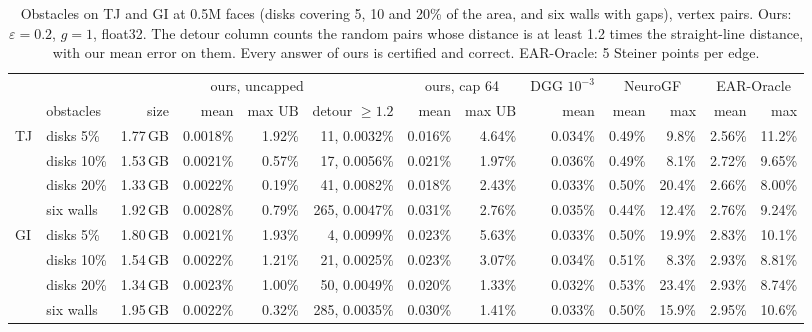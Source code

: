 \documentclass[sigconf,nonacm,screen]{acmart}
\newcommand{\UB}{\mathrm{UB}}
\newcommand{\eps}{\varepsilon}
\begin{document}
\begin{table}[t]
\caption{Obstacles on TJ and GI at 0.5M faces (disks covering 5, 10 and 20\% of the area, and six walls with gaps),
vertex pairs. Ours: $\eps=0.2$, $g=1$, float32. The detour column counts the random pairs whose distance is at least
1.2 times the straight-line distance, with our mean error on them. Every answer of ours is certified and correct.
EAR-Oracle: 5 Steiner points per edge.}
\label{tab:server-obst}
\small
\begin{tabular}{@{}ll|rrrr|rr|r|rr|rr@{}}
\toprule
 & & \multicolumn{4}{c|}{ours, uncapped} & \multicolumn{2}{c|}{ours, cap 64} & DGG $10^{-3}$ & \multicolumn{2}{c|}{NeuroGF} & \multicolumn{2}{c}{EAR-Oracle}\\
 & obstacles & size & mean & max $\UB$ & detour $\ge 1.2$ & mean & max $\UB$ & mean & mean & max & mean & max\\
\midrule
\multirow{4}{*}{TJ} & disks 5\% & 1.77\,GB & 0.0018\% & 1.92\% & 11, 0.0032\% & 0.016\% & 4.64\% & 0.034\% & 0.49\% & 9.8\% & 2.56\% & 11.2\%\\
 & disks 10\% & 1.53\,GB & 0.0021\% & 0.57\% & 17, 0.0056\% & 0.021\% & 1.97\% & 0.036\% & 0.49\% & 8.1\% & 2.72\% & 9.65\%\\
 & disks 20\% & 1.33\,GB & 0.0022\% & 0.19\% & 41, 0.0082\% & 0.018\% & 2.43\% & 0.033\% & 0.50\% & 20.4\% & 2.66\% & 8.00\%\\
 & six walls & 1.92\,GB & 0.0028\% & 0.79\% & 265, 0.0047\% & 0.031\% & 2.76\% & 0.035\% & 0.44\% & 12.4\% & 2.76\% & 9.24\%\\
\midrule
\multirow{4}{*}{GI} & disks 5\% & 1.80\,GB & 0.0021\% & 1.93\% & 4, 0.0099\% & 0.023\% & 5.63\% & 0.033\% & 0.50\% & 19.9\% & 2.83\% & 10.1\%\\
 & disks 10\% & 1.54\,GB & 0.0022\% & 1.21\% & 21, 0.0025\% & 0.023\% & 3.07\% & 0.034\% & 0.51\% & 8.3\% & 2.93\% & 8.81\%\\
 & disks 20\% & 1.34\,GB & 0.0023\% & 1.00\% & 50, 0.0049\% & 0.020\% & 1.33\% & 0.032\% & 0.53\% & 23.4\% & 2.93\% & 8.74\%\\
 & six walls & 1.95\,GB & 0.0022\% & 0.32\% & 285, 0.0035\% & 0.030\% & 1.41\% & 0.033\% & 0.50\% & 15.9\% & 2.95\% & 10.6\%\\
\bottomrule
\end{tabular}
\end{table}
\end{document}
